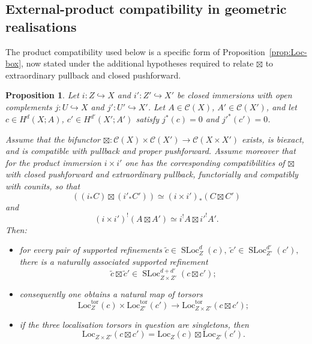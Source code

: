\documentclass[10pt,a4paper,dvipsnames,x11names]{amsart}
\newcommand{\C}{\mathcal C}
\newcommand{\Loc}{\mathrm{Loc}}
\newcommand{\SLoc}{\operatorname{SLoc}}
\numberwithin{equation}{section}
\theoremstyle{plain}
\newtheorem{proposition}[proposition]{Proposition}
\theoremstyle{definition}
\theoremstyle{remark}
\begin{document}
\subsection{External-product compatibility in geometric realisations}\label{subsec:Loc-box-model}

The product compatibility used below is a specific form of Proposition~\ref{prop:Loc-box}, now stated under the additional hypotheses required to relate $\boxtimes$ to extraordinary pullback and closed pushforward.

\begin{proposition} \label{prop:Loc-box-model}
Let $i:Z\hookrightarrow X$ and $i':Z'\hookrightarrow X'$ be closed immersions with open complements
$j:U\hookrightarrow X$ and $j':U'\hookrightarrow X'$. Let $A\in\C(X)$, $A'\in\C(X')$, and let
$c\in H^d(X;A)$, $c'\in H^{d'}(X';A')$ satisfy $j^*(c)=0$ and ${j'}^*(c')=0$.

Assume that the bifunctor
$
\boxtimes:\C(X)\times\C(X')\to\C(X\times X')
$
exists, is biexact, and is compatible with pullback and proper pushforward. Assume moreover that for the product immersion $i\times i'$ one has the corresponding compatibilities of $\boxtimes$ with closed pushforward and extraordinary pullback, functorially and compatibly with counits, so that
\begin{equation*}
((i_*C)\boxtimes (i'_*C'))\simeq (i\times i')_*(C\boxtimes C')
\end{equation*}
and
\begin{equation*}
(i\times i')^!(A\boxtimes A')\simeq i^!A\boxtimes {i'}^!A'.
\end{equation*}
Then:
\begin{itemize}
\item for every pair of supported refinements
$
\widetilde c\in \SLoc_Z^d(c),  \ 
\widetilde c'\in \SLoc_{Z'}^{d'}(c'),
$
there is a naturally associated supported refinement
\begin{equation}\label{eq:product-supported-refinement}
\widetilde c\boxtimes \widetilde c'\in \SLoc_{Z\times Z'}^{d+d'}(c\boxtimes c');
\end{equation}
\item consequently one obtains a natural map of torsors
\begin{equation}\label{eq:Loc-box-model-torsor}
\Loc_Z^{\mathrm{tor}}(c)\times \Loc_{Z'}^{\mathrm{tor}}(c')
\longrightarrow
\Loc^{\mathrm{tor}}_{Z\times Z'}(c\boxtimes c');
\end{equation}
\item if the three localisation torsors in question are singletons, then
\begin{equation}\label{eq:Loc-box-model}
\Loc_{Z\times Z'}(c\boxtimes c')
=
\Loc_Z(c)\boxtimes \Loc_{Z'}(c').
\end{equation}
\end{itemize}
\end{proposition}
\end{document}
